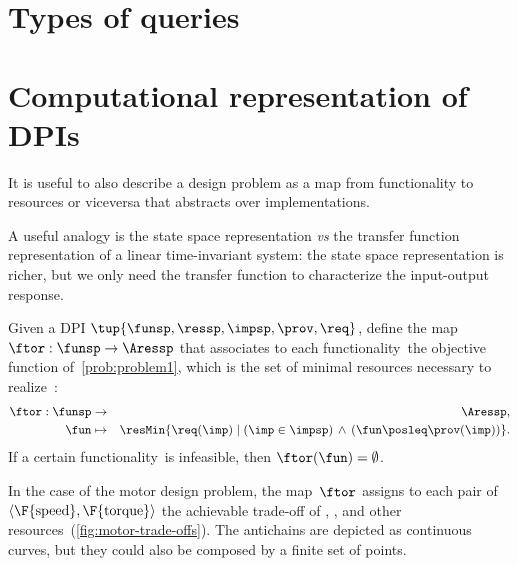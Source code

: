 
\section{Types of queries}

\section{Computational representation of DPIs}

It is useful to also describe a design problem as a map from functionality to resources or viceversa that abstracts over implementations.

A useful analogy is the state space representation \emph{vs} the transfer function representation of a linear time-invariant system:  the state space representation is richer, but we only need the transfer function to characterize the input-output response.


\begin{definition}
  \label{def:ftor}Given a DPI $\tup{ \funsp,\ressp,\impsp,\prov,\req} $,
  define the map~$\ftor:\funsp\rightarrow\Aressp$ that associates
  to each functionality~\fun the objective function of~\cref{prob:problem1},
  which is the set of minimal resources necessary to realize~\fun:
  \begin{eqnarray*}
    \ftor:\funsp & \rightarrow & \Aressp,\\
    \fun& \mapsto & \resMin\{\req(\imp)\mid\left(\imp\in\impsp\right)\,\wedge\,\left(\fun\posleq\prov(\imp)\right)\}.
  \end{eqnarray*}
  If a certain functionality~\fun is infeasible, then $\ftor(\fun)=\emptyset$.
\end{definition}



\begin{example}
  In the case of the motor design problem, the map~$\ftor$ assigns
  to each pair of $\left\langle \F{\text{speed}},\F{\text{torque}}\right\rangle $
  the achievable trade-off of , , and other resources~(\cref{fig:motor-trade-offs}).
  The antichains are depicted as continuous curves, but they could also
  be composed by a finite set of points.

\end{example}


